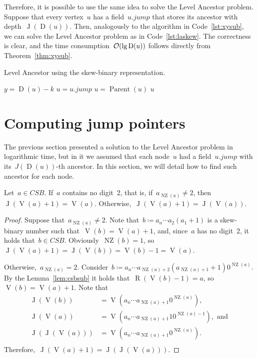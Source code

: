 \documentclass[main.tex]{subfiles}
\newcommand{\Par}{\operatorname{Parent}}
\newcommand{\Dep}{\operatorname{D}}
\newcommand{\NZ}{\operatorname{NZ}}
\newcommand{\CSB}{\textit{CSB}}
\renewcommand{\V}{\operatorname{V}}
\newcommand{\R}{\operatorname{R}}
\newcommand{\J}{\operatorname{J}}
\begin{document}
\newcommand{\jmp}{\mathit{jump}}

Therefore, it is possible to use the same idea to solve the Level Ancestor problem. Suppose that every vertex~$u$ has a field~$u.\jmp$ that stores its ancestor with depth~$\J(\Dep(u))$. Then, analogously to the algorithm in Code~\ref{lst:xysub}, we can solve the Level Ancestor problem as in Code~\ref{lst:laskew}. The correctness is clear, and the time consumption~$\Oh(\lg\Dep(u))$ follows directly from Theorem~\ref{thm:xysub}.

\begin{algorithm}
\caption{Level Ancestor using the skew-binary representation.} \label{lst:laskew}
\begin{algorithmic}[1]
		\State $y = \Dep(u) - k$
		\While{$\Dep(u) \neq y$}
			\If{$\Dep(u.\jmp) \geq y$}
				\State $u = u.\jmp$
			\Else
				\State $u = \Par(u)$
			\EndIf
		\EndWhile
		\State \Return $u$
	\EndFunction
\end{algorithmic}
\end{algorithm}

\section{Computing jump pointers}

The previous section presented a solution to the Level Ancestor problem in logarithmic time, but in it we assumed that each node~$u$ had a field~$u.\jmp$ with its~\mbox{$J(\Dep(u))$-th} ancestor. In this section, we will detail how to find such ancestor for each node.

\begin{theorem} \label{thm:csbj+1}
	Let~$a \in \CSB$. If~$a$ contains no digit~2, that is, if~$a_{\NZ(a)} \neq 2$, then~${\J(\V(a) + 1) = \V(a)}$. Otherwise,~$\J(\V(a) + 1) = \J(\V(a))$.
\end{theorem}
\begin{proof}
	Suppose that~$a_{\NZ(a)} \neq 2$. Note that~$b \coloneqq a_n \cdots a_2 (a_1 + 1)$ is a skew-binary number such that~${\V(b) = \V(a) + 1}$, and, since~$a$ has no digit~2, it holds that~${b \in \CSB}$. Obviously~${\NZ(b) = 1}$, so~${\J(\V(a) + 1) = \J(\V(b)) = \V(b) - 1 = \V(a)}$.

	Otherwise,~${a_{\NZ(a)} = 2}$. Consider~${b \coloneqq a_n \cdots a_{\NZ(a) + 2} (a_{\NZ(a) + 1} + 1) 0^{\NZ(a)}}$. By the Lemma~\ref{lem:csbsub} it holds that~${\R(\V(b) - 1) = a}$, so~${\V(b) = \V(a) + 1}$. Note that \vspace{-2ex}
	\[
	\begin{array}{ll}
		\J(\V(b))     &= \V(a_n \cdots a_{\NZ(a) + 1} 0^{\NZ(a)}), \\
		\J(\V(a))     &= \V(a_n \cdots a_{\NZ(a) + 1} 10^{\NZ(a)-1}),\text{ and} \\
		\J(\J(\V(a))) &= \V(a_n \cdots a_{\NZ(a) + 1} 0^{\NZ(a)}). \\
	\end{array}
	\]
	Therefore,~$\J(\V(a) + 1) = \J(\J(\V(a)))$.
\end{proof}
\end{document}
